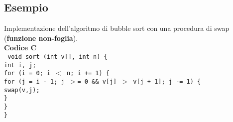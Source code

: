 \documentclass[../main.tex]{subfiles}
\begin{document}
\newpage

\subsection*{Esempio}
Implementazione dell'algoritmo di bubble sort con una procedura di swap
(\textbf{funzione non-foglia}).
\\[5mm]
\textbf{Codice C} \\
\texttt{
    void sort (int v[], int n) \{ \\
    \hspace*{0cm} \hspace*{0cm} \hspace*{0cm} \hspace*{0cm} int i, j; \\
    \hspace*{0cm} \hspace*{0cm} \hspace*{0cm} \hspace*{0cm} for (i = 0; i $<$ n; i += 1) \{ \\
    \hspace*{0cm} \hspace*{0cm} \hspace*{0cm} \hspace*{0cm} \hspace*{0cm} \hspace*{0cm} \hspace*{0cm} \hspace*{0cm} for (j = i - 1; j $>$= 0 \&\& v[j] $>$ v[j + 1]; j -= 1) \{ \\
    \hspace*{0cm} \hspace*{0cm} \hspace*{0cm} \hspace*{0cm} \hspace*{0cm} \hspace*{0cm} \hspace*{0cm} \hspace*{0cm} \hspace*{0cm} \hspace*{0cm} \hspace*{0cm} \hspace*{0cm} swap(v,j); \\
    \hspace*{0cm} \hspace*{0cm} \hspace*{0cm} \hspace*{0cm} \hspace*{0cm} \hspace*{0cm} \hspace*{0cm} \hspace*{0cm} \} \\
    \hspace*{0cm} \hspace*{0cm} \hspace*{0cm} \hspace*{0cm} \} \\
    \} \\[1mm]
}
\end{document}
